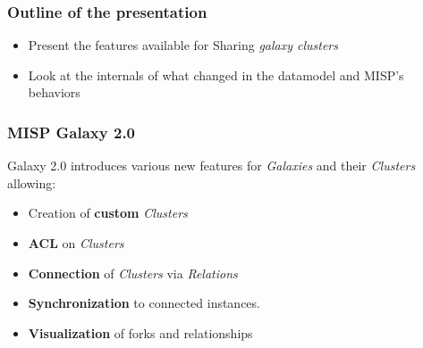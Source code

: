 
\begin{frame}[t,plain]
\titlepage
\end{frame}

\begin{frame}
    \frametitle{Outline of the presentation}
    \begin{itemize}
        \item Present the features available for Sharing \textit{galaxy clusters}
        \item Look at the internals of what changed in the datamodel and MISP's behaviors
    \end{itemize}
\end{frame}

\begin{frame}
    \frametitle{MISP Galaxy 2.0}
    Galaxy 2.0 introduces various new features for \textit{Galaxies} and their \textit{Clusters} allowing:
    \begin{itemize}
        \item Creation of \textbf{custom} \textit{Clusters}
        \item \textbf{ACL} on \textit{Clusters}
        \item \textbf{Connection} of \textit{Clusters} via \textit{Relations}
        \item \textbf{Synchronization} to connected instances.
        \item \textbf{Visualization} of forks and relationships
    \end{itemize}
\end{frame}

